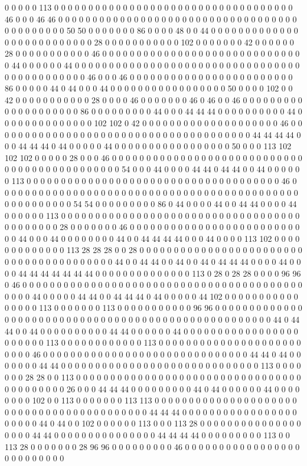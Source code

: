 0 0 0 0 0 113 0 0 0 0 0 0 0 0 0 0 0 0 0 0 0 0 0 0 0 0 0 0 0 0 0 0 0 0 0 0 0 0 0 0 0 46 0 0 0 46 46 0 0 0 0 0 0 0 0 0 0 0 0 0 0 0 0 0 0 0 0 0 0 0 0 0 0 0 0 0 0 0 0 0 0 0 0 0 0 0 0 0 0 0 0 50 50 0 0 0 0 0 0 0 86 0 0 0 0 48 0 0 44 0 0 0 0 0 0 0 0 0 0 0 0 0 0 0 0 0 0 0 0 0 0 0 0 0 0 28 0 0 0 0 0 0 0 0 0 0 0 102 0 0 0 0 0 0 0 42 0 0 0 0 0 0 28 0 0 0 0 0 0 0 0 0 0 0 46 0 0 0 0 0 0 0 0 0 0 0 0 0 0 0 0 0 0 0 0 0 0 0 0 0 0 0 0 0 0 44 0 0 0 0 0 0 44 0 0 0 0 0 0 0 0 0 0 0 0 0 0 0 0 0 0 0 0 0 0 0 0 0 0 0 0 0 0 0 0 0 0 0 0 0 0 0 0 0 0 0 0 0 46 0 0 0 46 0 0 0 0 0 0 0 0 0 0 0 0 0 0 0 0 0 0 0 0 0 0 0 0 86 0 0 0 0 0 44 0 44 0 0 0 44 0 0 0 0 0 0 0 0 0 0 0 0 0 0 0 0 0 50 0 0 0 0 102 0 0 42 0 0 0 0 0 0 0 0 0 0 0 28 0 0 0 0 46 0 0 0 0 0 0 0 46 0 46 0 0 46 0 0 0 0 0 0 0 0 0 0 0 0 0 0 0 0 0 0 0 0 86 0 0 0 0 0 0 0 0 0 44 0 0 0 44 44 44 0 0 0 0 0 0 0 0 0 0 44 0 0 0 0 0 0 0 0 0 0 0 0 0 0 102 102 0 42 0 0 0 0 0 0 0 0 0 0 0 0 0 0 0 0 0 0 0 0 46 0 0 0 0 0 0 0 0 0 0 0 0 0 0 0 0 0 0 0 0 0 0 0 0 0 0 0 0 0 0 0 0 0 0 0 0 0 0 44 44 44 44 0 0 0 44 44 44 0 44 0 0 0 0 0 44 0 0 0 0 0 0 0 0 0 0 0 0 0 0 0 0 0 50 0 0 0 113 102 102 102 0 0 0 0 0 28 0 0 0 46 0 0 0 0 0 0 0 0 0 0 0 0 0 0 0 0 0 0 0 0 0 0 0 0 0 0 0 0 0 0 0 0 0 0 0 0 0 0 0 0 0 0 0 0 0 54 0 0 0 44 0 0 0 0 44 44 0 44 44 0 0 44 0 0 0 0 0 0 113 0 0 0 0 0 0 0 0 0 0 0 0 0 0 0 0 0 0 0 0 0 0 0 0 0 0 0 0 0 0 0 0 0 0 0 0 0 46 0 0 0 0 0 0 0 0 0 0 0 0 0 0 0 0 0 0 0 0 0 0 0 0 0 0 0 0 0 0 0 0 0 0 0 0 0 0 0 0 0 0 0 0 0 0 0 0 0 0 0 0 0 0 54 54 0 0 0 0 0 0 0 0 0 86 0 44 0 0 0 0 44 0 0 44 44 0 0 0 0 44 0 0 0 0 0 0 113 0 0 0 0 0 0 0 0 0 0 0 0 0 0 0 0 0 0 0 0 0 0 0 0 0 0 0 0 0 0 0 0 0 0 0 0 0 0 0 0 0 0 0 28 0 0 0 0 0 0 0 46 0 0 0 0 0 0 0 0 0 0 0 0 0 0 0 0 0 0 0 0 0 0 0 0 0 0 0 44 0 0 0 44 0 0 0 0 0 0 0 0 44 0 0 44 44 44 44 0 0 0 44 0 0 0 0 113 102 0 0 0 0 0 0 0 0 0 0 0 0 0 113 28 28 28 0 0 28 0 0 0 0 0 0 0 0 0 0 0 0 0 0 0 0 0 0 0 0 0 0 0 0 0 0 0 0 0 0 0 0 0 0 0 0 0 0 0 0 44 0 0 44 44 0 0 44 0 0 44 0 44 44 44 0 0 0 0 44 0 0 0 0 44 44 44 44 44 44 44 0 0 0 0 0 0 0 0 0 0 0 0 0 0 113 0 28 0 28 28 0 0 0 0 96 96 0 46 0 0 0 0 0 0 0 0 0 0 0 0 0 0 0 0 0 0 0 0 0 0 0 0 0 0 0 0 0 0 0 0 0 0 0 0 0 0 0 0 0 0 0 0 0 44 0 0 0 0 0 44 44 0 0 44 44 44 0 44 0 0 0 0 0 44 102 0 0 0 0 0 0 0 0 0 0 0 0 0 0 0 0 113 0 0 0 0 0 0 0 113 0 0 0 0 0 0 0 0 0 0 0 96 96 0 0 0 0 0 0 0 0 0 0 0 0 0 0 0 0 0 0 0 0 0 0 0 0 0 0 0 0 0 0 0 0 0 0 0 0 0 0 0 0 0 0 0 0 0 0 0 0 0 0 0 0 44 0 44 44 0 0 44 0 0 0 0 0 0 0 0 0 0 44 44 0 0 0 0 0 0 44 0 0 0 0 0 0 0 0 0 0 0 0 0 0 0 0 0 0 0 0 0 0 0 113 0 0 0 0 0 0 0 0 0 0 0 0 113 0 0 0 0 0 0 0 0 0 0 0 0 0 0 0 0 0 0 0 0 0 0 0 0 0 46 0 0 0 0 0 0 0 0 0 0 0 0 0 0 0 0 0 0 0 0 0 0 0 0 0 0 0 0 0 0 44 44 0 44 0 0 0 0 0 0 0 44 44 0 0 0 0 0 0 0 0 0 0 0 0 0 0 0 0 0 0 0 0 0 0 0 0 0 0 0 0 0 113 0 0 0 0 0 0 0 28 28 0 0 113 0 0 0 0 0 0 0 0 0 0 0 0 0 0 0 0 0 0 0 0 0 0 0 0 0 0 0 0 0 0 0 0 0 0 0 0 0 0 0 0 0 0 26 0 0 0 44 44 44 0 0 0 0 0 0 0 0 0 44 0 44 0 0 0 0 0 0 44 0 0 0 0 0 0 0 0 102 0 0 113 0 0 0 0 0 0 0 113 113 0 0 0 0 0 0 0 0 0 0 0 0 0 0 0 0 0 0 0 0 0 0 0 0 0 0 0 0 0 0 0 0 0 0 0 0 0 0 0 0 0 0 44 44 44 0 0 0 0 0 0 0 0 0 0 0 0 0 0 0 0 0 0 0 0 0 0 44 0 44 0 0 102 0 0 0 0 0 0 113 0 0 0 113 28 0 0 0 0 0 0 0 0 0 0 0 0 0 0 0 0 0 0 0 44 44 0 0 0 0 0 0 0 0 0 0 0 0 0 0 0 44 44 44 44 0 0 0 0 0 0 0 0 0 113 0 0 113 28 0 0 0 0 0 0 0 28 96 96 0 0 0 0 0 0 0 0 0 46 0 0 0 0 0 0 0 0 0 0 0 0 0 0 0 0 0 0 0 0 0 0 0 0 0 0 